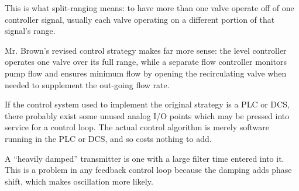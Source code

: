 \vskip 10pt

This is what split-ranging means: to have more than one valve operate off of one controller signal, usually each valve operating on a different portion of that signal's range.

\vskip 10pt

Mr. Brown's revised control strategy makes far more sense: the level controller operates one valve over its full range, while a separate flow controller monitors pump flow and ensures minimum flow by opening the recirculating valve when needed to supplement the out-going flow rate.

\vskip 10pt

If the control system used to implement the original strategy is a PLC or DCS, there probably exist some unused analog I/O points which may be pressed into service for a control loop.  The actual control algorithm is merely software running in the PLC or DCS, and so costs nothing to add.

\vskip 10pt

A ``heavily damped'' transmitter is one with a large filter time entered into it.  This is a problem in any feedback control loop because the damping adds phase shift, which makes oscillation more likely.




